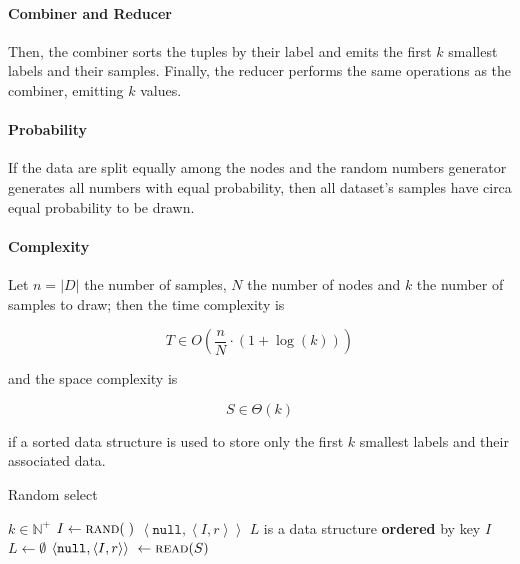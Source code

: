 \documentclass[parskip=full]{report}
\begin{document}
\paragraph{Combiner and Reducer}
Then, the combiner sorts the tuples by their label and emits the first $k$
smallest labels and their samples. Finally, the reducer performs the same
operations as the combiner, emitting $k$ values.

\paragraph{Probability}
If the data are split equally among the nodes and the random numbers generator generates all numbers with equal probability, then all dataset's samples have circa equal probability to be drawn.

\paragraph{Complexity}
Let $n = |D|$ the number of samples, $N$ the number of nodes and $k$ the number of samples to draw; then the time complexity is

\[
T \in O \left(\dfrac{n}{N} \cdot \left(1 + \log(k)\right)\right)
\]

and the space complexity is

\[
S \in \Theta \left(k\right)
\]

if a sorted data structure is used to store only the first $k$ smallest labels
and their associated data.

\begin{algorithm}[H]
	\caption{Random select}\label{alg:random_map}
	\begin{algorithmic}
		\Require $k \in \mathbb{N}^+$
			\State $I \gets \Call{rand}{\;}$
			\State \Return $\left< \texttt{null}, \left< I, r\right> \right>$
		\EndProcedure
		\vspace{.25cm}
			\State $L$ is a data structure \textbf{ordered} by key $I$
			\State $L \gets \emptyset$
				\State $\left< \texttt{null}, \left< I, r\right> \right> \
					\gets \Call{read}{S}$
				\State {}
					\State {}
				\EndIf

				\State {}
			\EndWhile
				\State {}
			\EndFor
		\EndProcedure
		\vspace{.25cm}
			\State {} 
		\EndProcedure
	\end{algorithmic}
\end{algorithm}
\end{document}
